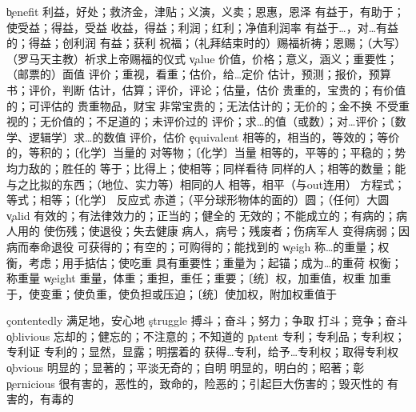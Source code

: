 \begin{multicols}{2}
\c{benefit}  \n 利益，好处；救济金，津贴；义演，义卖；恩惠，恩泽 \vt 有益于，有助于；使受益；得益，受益
  \n 收益，得益；利润；红利；净值利润率 \vt 有益于…，对…有益的；得益；创利润 \vi 有益；获利
  \n 祝福；（礼拜结束时的）赐福祈祷；恩赐；（大写）（罗马天主教）祈求上帝赐福的仪式
\c{value}  \n 价值，价格；意义，涵义；重要性；（邮票的）面值 \vt 评价；重视，看重；估价，给…定价
  \n 估计，预测；报价，预算书；评价，判断 \vt 估计，估算；评价，评论；估量，估价 
  \a 贵重的，宝贵的；有价值的；可评估的 \n 贵重物品，财宝
  \a 非常宝贵的；无法估计的；无价的；金不换
  \a 不受重视的；无价值的；不足道的；未评价过的
  \vt 评价；求…的值（或数）；对…评价；〔数学、逻辑学〕求…的数值 \vi 评价，估价
\c{equivalent}  \a 相等的，相当的，等效的；等价的，等积的；〔化学〕当量的 \n 对等物；〔化学〕当量
  \a 相等的，平等的；平稳的；势均力敌的；胜任的 \vt 等于；比得上；使相等；同样看待 \n 同样的人；相等的数量；能与之比拟的东西；（地位、实力等）相同的人 \vi 相等，相平（与out连用） 
  \n 方程式；等式；相等；〔化学〕 反应式
  \n 赤道；（平分球形物体的面的）圆；（任何）大圆
\c{valid}  \a 有效的；有法律效力的；正当的；健全的
  \a 无效的；不能成立的；有病的；病人用的 \vt 使伤残；使退役；失去健康 \n 病人，病号；残废者；伤病军人 \vi 变得病弱；因病而奉命退役
  \a 可获得的；有空的；可购得的；能找到的
\c{weigh}  \vt 称…的重量；权衡，考虑；用手掂估；使吃重 \vi 具有重要性；重量为；起锚；成为…的重荷 \n 权衡；称重量 
\c{weight}  \n 重量，体重；重担，重任；重要；〔统〕权，加重值，权重 \vt 加重于，使变重；使负重，使负担或压迫；〔统〕使加权，附加权重值于

\c{contentedly}  \ad 满足地，安心地
\c{struggle}  \vi 搏斗；奋斗；努力；争取 \n 打斗；竞争；奋斗
\c{oblivious}  \a 忘却的；健忘的；不注意的；不知道的
\c{patent}  \n 专利；专利品；专利权；专利证 \a 专利的；显然，显露；明摆着的 \vt 获得…专利，给予…专利权；取得专利权 
\c{obvious}  \a 明显的；显著的；平淡无奇的；自明
  \a 明显的，明白的；昭著；彰
\c{pernicious}  \a 很有害的，恶性的，致命的，险恶的；引起巨大伤害的；毁灭性的
  \a 有害的，有毒的


\end{multicols}
